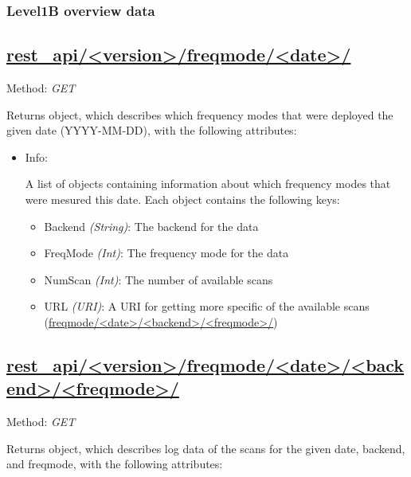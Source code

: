 \subsubsection{Level1B overview data}
\subsection*{\url{rest_api/<version>/freqmode/<date>/}}
Method: \emph{GET}

Returns object, which describes which frequency modes that were deployed the
given date (YYYY-MM-DD), with the following attributes:
\begin{itemize}
    \item Info:

        A list of objects containing information about which
        frequency modes that were mesured this date. 
        Each object contains the following keys:

        \begin{itemize}
            \item Backend \emph{(String)}: The backend for the data
            \item FreqMode \emph{(Int)}: The frequency mode for the data
            \item NumScan \emph{(Int)}: The number of available scans
            \item URL \emph{(URI)}: A URI 
                for getting more specific of the available scans\\ 
                 (\url{freqmode/<date>/<backend>/<freqmode>/})
        \end{itemize}
\end{itemize}

\subsection*{\url{rest_api/<version>/freqmode/<date>/<backend>/<freqmode>/}}
Method: \emph{GET}

Returns object, which describes log data of the scans  
for the given date, backend, and freqmode,
with the following attributes:


